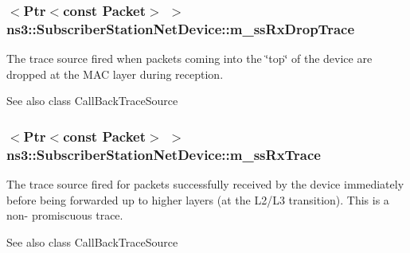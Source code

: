 \subsubsection[{\texorpdfstring{m\+\_\+ss\+Rx\+Drop\+Trace}{m_ssRxDropTrace}}]{$<${\bf Ptr}$<$const {\bf Packet}$>$ $>$ ns3\+::\+Subscriber\+Station\+Net\+Device\+::m\+\_\+ss\+Rx\+Drop\+Trace\hspace{0.3cm}{\ttfamily [private]}}\hypertarget{classns3_1_1SubscriberStationNetDevice_aa8ecbe05da5dcc544b94a2965cabdb9f}{}\label{classns3_1_1SubscriberStationNetDevice_aa8ecbe05da5dcc544b94a2965cabdb9f}
The trace source fired when packets coming into the \char`\"{}top\char`\"{} of the device are dropped at the M\+AC layer during reception.

\begin{DoxySeeAlso}{See also}
class Call\+Back\+Trace\+Source 
\end{DoxySeeAlso}
\subsubsection[{\texorpdfstring{m\+\_\+ss\+Rx\+Trace}{m_ssRxTrace}}]{$<${\bf Ptr}$<$const {\bf Packet}$>$ $>$ ns3\+::\+Subscriber\+Station\+Net\+Device\+::m\+\_\+ss\+Rx\+Trace\hspace{0.3cm}{\ttfamily [private]}}\hypertarget{classns3_1_1SubscriberStationNetDevice_a88c8f706dea73606f68daa73703f65b5}{}\label{classns3_1_1SubscriberStationNetDevice_a88c8f706dea73606f68daa73703f65b5}
The trace source fired for packets successfully received by the device immediately before being forwarded up to higher layers (at the L2/\+L3 transition). This is a non-\/ promiscuous trace.

\begin{DoxySeeAlso}{See also}
class Call\+Back\+Trace\+Source 
\end{DoxySeeAlso}
